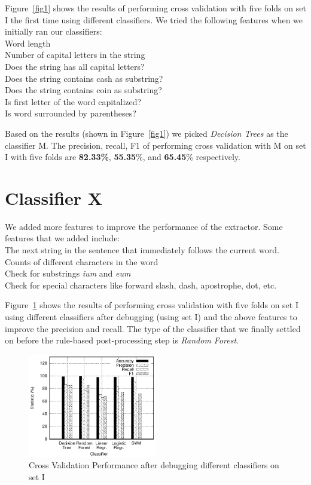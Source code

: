 \documentclass[12pt,letterpaper]{article}
\begin{document}
Figure~\ref{fig1} shows the results of performing cross validation with five folds on set I the first time using different classifiers. We tried the following features when we initially ran our classifiers:
\\\indent Word length
\\\indent Number of capital letters in the string
\\\indent Does the string has all capital letters?
\\\indent Does the string contains cash as substring?
\\\indent Does the string contains coin as substring?
\\\indent Is first letter of the word capitalized?
\\\indent Is word surrounded by parentheses?


Based on the results (shown in Figure~\ref{fig1}) we picked \textit{Decision Trees} as the classifier M. The precision, recall, F1 of performing cross validation with M on set I with five folds are \textbf{82.33\%}, \textbf{55.35}\%, and \textbf{65.45}\% respectively.


\section*{Classifier X}
We added more features to improve the performance of the extractor. Some features that we added include:
\\\indent The next string in the sentence that immediately follows the current word.
\\\indent Counts of different characters in the word
\\\indent Check for substrings \textit{ium} and \textit{eum}
\\\indent Check for special characters like forward slash, dash, apostrophe, dot, etc.

Figure~\ref{fig2} shows the results of performing cross validation with five folds on set I using different classifiers after debugging (using set I) and the above features to improve the precision and recall. The type of the classifier that we finally settled on before the rule-based post-processing step is \textit{Random Forest}. 
\begin{figure}[h]
\centering
\includegraphics[width=0.5\textwidth]{X_I}
\caption{Cross Validation Performance after debugging different classifiers on set I}
\label{fig2}
\end{figure}
\end{document}
